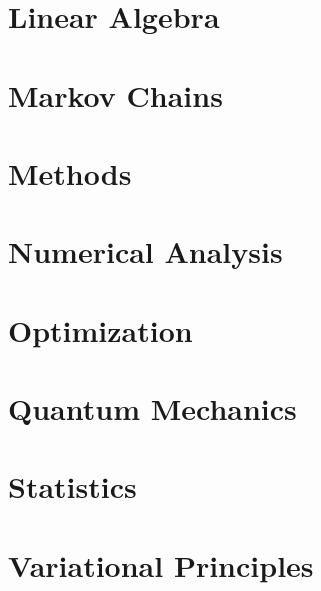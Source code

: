 \chapter{Linear Algebra}
\begingroup
\graphicspath{{../part-ib/linear-algebra/}}


\endgroup
\chapter{Markov Chains}
\begingroup
\graphicspath{{../part-ib/markov-chains/}}


\endgroup
\chapter{Methods}
\begingroup
\graphicspath{{../part-ib/methods/}}


\endgroup
\chapter{Numerical Analysis}
\begingroup
\graphicspath{{../part-ib/numerical-analysis/}}


\endgroup
\chapter{Optimization}
\begingroup
\graphicspath{{../part-ib/optimisation/}}


\endgroup
\chapter{Quantum Mechanics}
\begingroup
\graphicspath{{../part-ib/quantum-mechanics/}}


\endgroup
\chapter{Statistics}
\begingroup
\graphicspath{{../part-ib/statistics/}}


\endgroup
\chapter{Variational Principles}
\begingroup
\graphicspath{{../part-ib/variational-principles/}}


\endgroup

